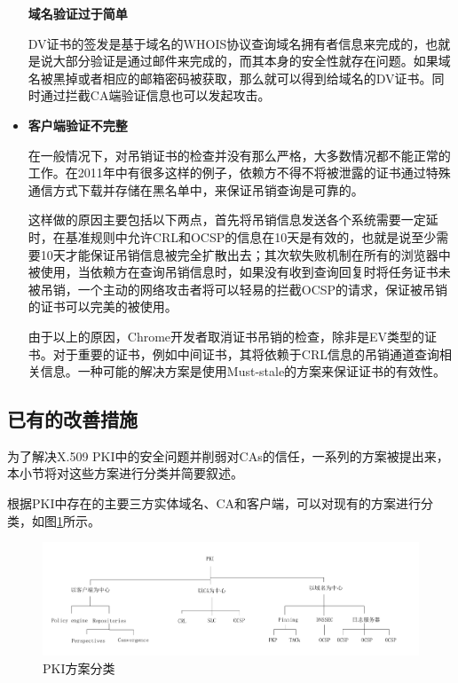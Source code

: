 \begin{itemize}
	\noindent\textbf{域名验证过于简单}

	DV证书的签发是基于域名的WHOIS协议查询域名拥有者信息来完成的，也就是说大部分验证是通过邮件来完成的，而其本身的安全性就存在问题。如果域名被黑掉或者相应的邮箱密码被获取，那么就可以得到给域名的DV证书。同时通过拦截CA端验证信息也可以发起攻击。



	\item 

	\noindent\textbf{客户端验证不完整}

	在一般情况下，对吊销证书的检查并没有那么严格，大多数情况都不能正常的工作。在2011年中有很多这样的例子，依赖方不得不将被泄露的证书通过特殊通信方式下载并存储在黑名单中，来保证吊销查询是可靠的。

	这样做的原因主要包括以下两点，首先将吊销信息发送各个系统需要一定延时，在基准规则中允许CRL和OCSP的信息在10天是有效的，也就是说至少需要10天才能保证吊销信息被完全扩散出去；其次软失败机制在所有的浏览器中被使用，当依赖方在查询吊销信息时，如果没有收到查询回复时将任务证书未被吊销，一个主动的网络攻击者将可以轻易的拦截OCSP的请求，保证被吊销的证书可以完美的被使用。

	由于以上的原因，Chrome开发者取消证书吊销的检查，除非是EV类型的证书。对于重要的证书，例如中间证书，其将依赖于CRL信息的吊销通道查询相关信息。一种可能的解决方案是使用Must-stale的方案来保证证书的有效性。

\end{itemize}


\subsection{已有的改善措施}

为了解决X.509 PKI中的安全问题并削弱对CAs的信任，一系列的方案被提出来，本小节将对这些方案进行分类并简要叙述。



根据PKI中存在的主要三方实体域名、CA和客户端，可以对现有的方案进行分类，如图\ref{fig:Classification_of_PKI_proposals}所示。

\begin{figure}[htbp]
 	\centering
 	\includegraphics[width = 1.0\textwidth]{img/Classification_of_PKI_proposals}
 	\caption{PKI方案分类}\label{fig:Classification_of_PKI_proposals}
\end{figure}



